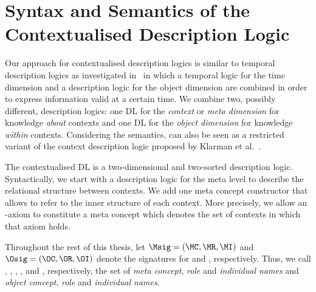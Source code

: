 \section{Syntax and Semantics of the Contextualised Description Logic \texorpdfstring{\LMLO}{LM[LO]}}
\label{sec:syn-seman-cdl}

Our approach for contextualised description logics is similar to temporal description logics as
investigated in~\cite{LuWZ-TIME08} in which a temporal logic for the time dimension and a
description logic for the object dimension are combined in order to express information valid at a
certain time. We combine two, possibly different, description logics: one DL \LM for the
\emph{context} or \emph{meta dimension} for knowledge \emph{about} contexts and one DL \LO for the
\emph{object dimension} for knowledge \emph{within} contexts.
%
Considering the semantics, \LMLO can also be seen as a restricted variant of the context description
logic proposed by Klarman et al.~\cite{KG16}.

The contextualised DL \LMLO is a two-dimensional and two-sorted description logic. Syntactically, we
start with a description logic \LM for the meta level to describe the relational structure between
contexts. We add one meta concept constructor that allows to refer to the inner structure of
each context. More precisely, we allow an \LO-axiom to constitute a meta concept which denotes the
set of contexts in which that axiom holds.

Throughout the rest of this thesis, let $\Msig = (\MC, \MR, \MI)$ and $\Osig = (\OC, \OR, \OI)$
denote the signatures for \LM and \LO, respectively. Thus, we call \MC, \MR, \MI, \OC, \OR and \OI,
respectively, the set of \emph{meta concept}, \emph{role} and \emph{individual names} and
\emph{object concept}, \emph{role} and \emph{individual names}.

